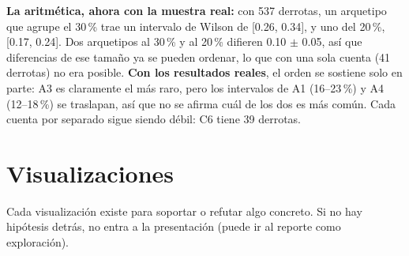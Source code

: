 \documentclass[11pt,letterpaper]{article}
\begin{document}
\noindent \textbf{La aritmética, ahora con la muestra real:} con 537 derrotas, un
arquetipo que agrupe el 30\,\% trae un intervalo de Wilson de [0.26, 0.34], y uno del
20\,\%, [0.17, 0.24]. Dos arquetipos al 30\,\% y al 20\,\% difieren 0.10 \(\pm\) 0.05,
así que diferencias de ese tamaño ya se pueden ordenar, lo que con una sola cuenta (41
derrotas) no era posible. \textbf{Con los resultados reales}, el orden se sostiene solo
en parte: A3 es claramente el más raro, pero los intervalos de A1 (16--23\,\%) y A4
(12--18\,\%) se traslapan, así que no se afirma cuál de los dos es más común. Cada
cuenta por separado sigue siendo débil: C6 tiene 39 derrotas.

\section{Visualizaciones}
\label{sec:vis}

Cada visualización existe para soportar o refutar algo concreto. Si no hay hipótesis
detrás, no entra a la presentación (puede ir al reporte como exploración).
\end{document}
